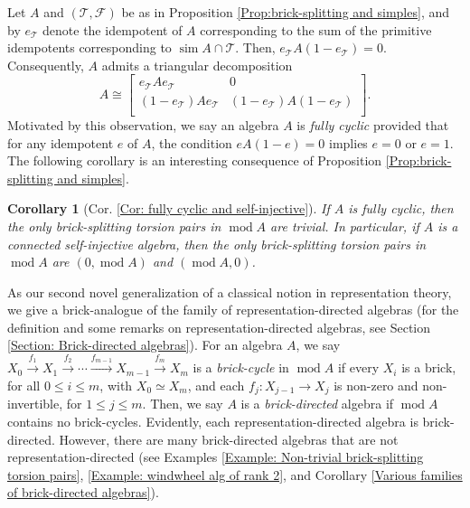 \documentclass{amsart}
\theoremstyle{thmstyle}
\newtheorem{corollary}[thm]{Corollary}
\theoremstyle{exstyle}
\theoremstyle{defstyle}
\theoremstyle{remstyle}
\theoremstyle{remstyle}
\DeclareMathOperator*{\modu}{mod}
\DeclareMathOperator*{\simp}{sim}
\begin{document}
Let $A$ and $(\mathcal{T},\mathcal{F})$ be as in Proposition \ref{Prop:brick-splitting and simples}, and by $e_{\mathcal{T}}$ denote the idempotent of $A$ corresponding to the sum of the primitive idempotents corresponding to $\simp A \cap \mathcal{T}$. Then, $e_{\mathcal{T}}A(1-e_{\mathcal{T}})=0$. Consequently, $A$ admits a triangular decomposition
$$A \cong \left[\begin{array}{cc}
   e_{\mathcal{T}}Ae_{\mathcal{T}}  &  0\\
   (1-e_{\mathcal{T}})Ae_{\mathcal{T}}  & (1-e_{\mathcal{T}})A(1-e_{\mathcal{T}})\\ 
\end{array}\right].$$
Motivated by this observation, we say an algebra $A$ is \emph{fully cyclic} provided that for any idempotent $e$ of $A$, the condition $eA(1-e)=0$ implies $e=0$ or $e=1$. The following corollary is an interesting consequence of Proposition \ref{Prop:brick-splitting and simples}.

\begin{corollary}[Cor. \ref{Cor: fully cyclic and self-injective}]
\label{Cor: No brick-splitting over self-injective algebras}
If $A$ is fully cyclic, then the only brick-splitting torsion pairs in $\modu A$ are trivial. In particular, if $A$ is a connected self-injective algebra, then the only brick-splitting torsion pairs in $\modu A$ are $(0,\modu A)$ and $(\modu A, 0)$.
\end{corollary}

As our second novel generalization of a classical notion in representation theory, we give a brick-analogue of the family of representation-directed algebras (for the definition and some remarks on representation-directed algebras, see Section \ref{Section: Brick-directed algebras}). 
For an algebra $A$, we say $X_0\xrightarrow{f_1} X_1\xrightarrow{f_2}  \cdots \xrightarrow{f_{m-1}}  X_{m-1}\xrightarrow{f_m}  X_m$ is a \emph{brick-cycle} in $\modu A$ if every $X_i$ is a brick, for all $0\leq i\leq m$, with $X_0\simeq X_m$, and each $f_j:X_{j-1}\rightarrow X_j$ is non-zero and non-invertible, for $1\leq j \leq m$. Then, we say $A$ is a \emph{brick-directed} algebra if $\modu A$ contains no brick-cycles. Evidently, each representation-directed algebra is brick-directed. However, there are many brick-directed algebras that are not representation-directed  (see Examples \ref{Example: Non-trivial brick-splitting torsion pairs}, \ref{Example: windwheel alg of rank 2}, and Corollary \ref{Various families of brick-directed algebras}).
\end{document}
